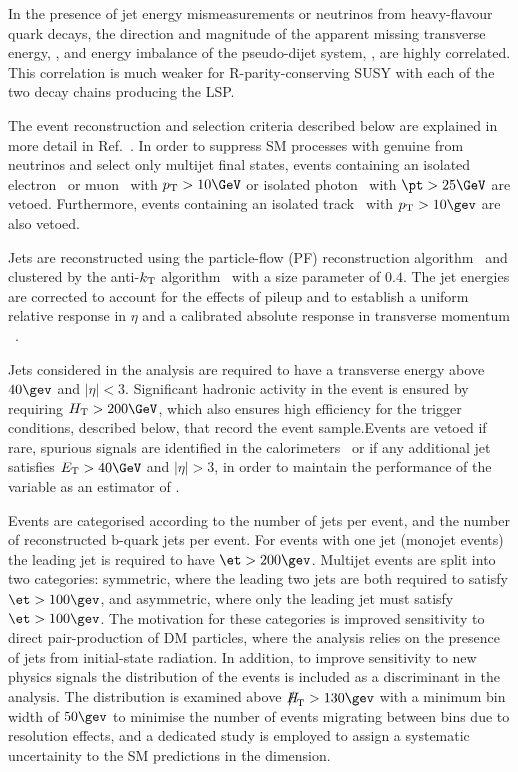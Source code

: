 In the presence of jet energy mismeasurements or neutrinos from
heavy-flavour quark decays, the direction and magnitude of the
apparent missing transverse energy, \mht, and energy imbalance of the
pseudo-dijet system, \dht, are highly correlated. This correlation is
much weaker for R-parity-conserving SUSY with each of the two decay
chains producing the LSP.

The event reconstruction and selection criteria described below are
explained in more detail in Ref.~\cite{RA1Paper2012}.
In order to suppress SM processes with genuine \met from neutrinos and
select only multijet final states, events containing an isolated
electron~\cite{PAS-EGM-10-004} or muon~\cite{PAS-MUO-10-004} with $\Pt
> 10\GeV$ or isolated photon~\cite{PAS-EGM-10-006} with $\pt > 25\GeV$
are vetoed. Furthermore, events containing an isolated
track~\cite{single-lepton-stop} with $\Pt > 10\gev$ are also vetoed.

Jets are reconstructed using the particle-flow (PF) reconstruction
algorithm~\cite{CMS-PAS-PFT-09-001, CMS-PAS-PFT-10-001} and 
clustered by the anti-$k_{\rm T}$ algorithm~\cite{antikt} with
a size parameter of $0.4$. The jet energies are corrected to account for the effects of pileup
and to establish a uniform relative response in $\eta$ and a
calibrated absolute response in transverse momentum
\pt~\cite{2011arXiv1107.4277C}.

Jets considered in the analysis are required to have a transverse
energy above $40\gev$ and $|\eta| < 3$. Significant hadronic activity
in the event is ensured by requiring $\scalht > 200\GeV$, which also
ensures high efficiency for the trigger conditions, described below,
that record the event sample.Events are vetoed if rare, spurious signals are identified in the
calorimeters~\cite{1748-0221-5-03-T03014, CMS-NOTE-2010-012} or if any
additional jet satisfies $\Et > 40\GeV$ and $|\eta| > 3$, in order to
maintain the performance of the variable \mht as an estimator of \met.

Events are categorised according to the number of jets per event,
and the number of reconstructed b-quark jets
per event. For events with one jet (monojet events) the leading jet is required to have $\et > 200\gev$. Multijet events are split into two categories: symmetric, where the leading two jets are both required to satisfy $\et > 100\gev$, and asymmetric, where only the leading jet must satisfy $\et > 100\gev$. The motivation for these categories is improved sensitivity to direct pair-production of DM particles, where the analysis relies on the presence of jets from initial-state radiation. In addition, to improve sensitivity to new physics signals the \mht distribution of the events is included as a discriminant in the analysis. The \mht distribution is examined above $\mht > 130\gev$ with a minimum  bin width of $50\gev$ to minimise the number of events migrating between bins due to resolution effects, and a dedicated study is employed to assign a systematic uncertainity to the SM predictions in the \mht dimension.

